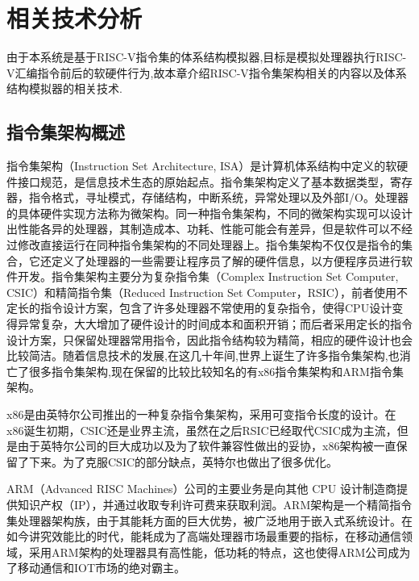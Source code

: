 
\chapter{相关技术分析}

由于本系统是基于RISC-V指令集的体系结构模拟器,目标是模拟处理器执行RISC-V汇编指令前后的软硬件行为,故本章介绍RISC-V指令集架构相关的内容以及体系结构模拟器的相关技术.

\section{指令集架构概述}

指令集架构（Instruction Set Architecture, ISA）是计算机体系结构中定义的软硬件接口规范，是信息技术生态的原始起点\cite{刘畅2021risc}。指令集架构定义了基本数据类型，寄存器，指令格式，寻址模式，存储结构，中断系统，异常处理以及外部I/O\cite{huweiwu}。处理器的具体硬件实现方法称为微架构。同一种指令集架构，不同的微架构实现可以设计出性能各异的处理器，其制造成本、功耗、性能可能会有差异，但是软件可以不经过修改直接运行在同种指令集架构的不同处理器上。指令集架构不仅仅是指令的集合，它还定义了处理器的一些需要让程序员了解的硬件信息，以方便程序员进行软件开发。指令集架构主要分为复杂指令集（Complex Instruction Set Computer, CSIC）和精简指令集（Reduced Instruction Set Computer，RSIC），前者使用不定长的指令设计方案，包含了许多处理器不常使用的复杂指令，使得CPU设计变得异常复杂，大大增加了硬件设计的时间成本和面积开销；而后者采用定长的指令设计方案，只保留处理器常用指令，因此指令结构较为精简，相应的硬件设计也会比较简洁。随着信息技术的发展,在这几十年间,世界上诞生了许多指令集架构,也消亡了很多指令集架构,现在保留的比较比较知名的有x86指令集架构和ARM指令集架构。


x86是由英特尔公司推出的一种复杂指令集架构，采用可变指令长度的设计。在x86诞生初期，CSIC还是业界主流，虽然在之后RSIC已经取代CSIC成为主流，但是由于英特尔公司的巨大成功以及为了软件兼容性做出的妥协，x86架构被一直保留了下来。为了克服CSIC的部分缺点，英特尔也做出了很多优化。


ARM（Advanced RISC Machines）公司的主要业务是向其他 CPU 设计制造商提供知识产权（IP），并通过收取专利许可费来获取利润。ARM架构是一个精简指令集处理器架构族，由于其能耗方面的巨大优势，被广泛地用于嵌入式系统设计。在如今讲究效能比的时代，能耗成为了高端处理器市场最重要的指标，在移动通信领域，采用ARM架构的处理器具有高性能，低功耗的特点，这也使得ARM公司成为了移动通信和IOT市场的绝对霸主。

